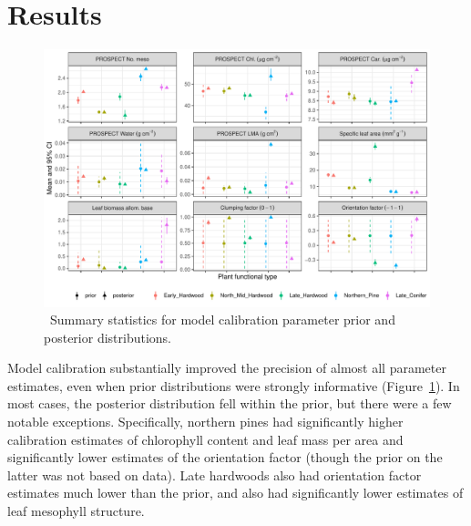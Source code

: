 \section{Results}


\begin{figure}
  \centering
  \includegraphics[width=\textwidth]{4_edr/figures/explore_spectra/pda_summary.pdf}
  \caption{\
    Summary statistics for model calibration parameter prior and posterior distributions.
  }\label{fig:pda_posteriors}
\end{figure}

Model calibration substantially improved the precision of almost all parameter estimates, even when prior distributions were strongly informative (Figure~\ref{fig:pda_posteriors}).
In most cases, the posterior distribution fell within the prior, but there were a few notable exceptions.
Specifically, northern pines had significantly higher calibration estimates of chlorophyll content and leaf mass per area and significantly lower estimates of the orientation factor (though the prior on the latter was not based on data).
Late hardwoods also had orientation factor estimates much lower than the prior, and also had significantly lower estimates of leaf mesophyll structure.

